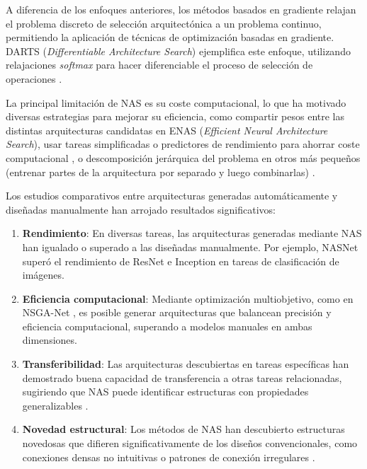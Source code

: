A diferencia de los enfoques anteriores, los métodos basados en gradiente relajan el problema discreto de selección arquitectónica a un problema continuo, permitiendo la aplicación de técnicas de optimización basadas en gradiente. DARTS (\textit{Differentiable Architecture Search}) ejemplifica este enfoque, utilizando relajaciones \textit{softmax} para hacer diferenciable el proceso de selección de operaciones \cite{Liu2018}.



La principal limitación de NAS es su coste computacional, lo que ha motivado diversas estrategias para mejorar su eficiencia, como compartir pesos entre las distintas arquitecturas candidatas \cite{Pham2018} en ENAS (\textit{Efficient Neural Architecture Search}), usar tareas simplificadas o predictores de rendimiento para ahorrar coste computacional \cite{Baker2018}, o descomposición jerárquica del problema en otros más pequeños (entrenar partes de la arquitectura por separado y luego combinarlas) \cite{Miikkulainen2019,Liu2018}.


Los estudios comparativos entre arquitecturas generadas automáticamente y diseñadas manualmente han arrojado resultados significativos:

\begin{enumerate}
\item \textbf{Rendimiento}: En diversas tareas, las arquitecturas generadas mediante NAS han igualado o superado a las diseñadas manualmente. Por ejemplo, NASNet \cite{Zoph2018} superó el rendimiento de ResNet e Inception en tareas de clasificación de imágenes.

\item \textbf{Eficiencia computacional}: Mediante optimización multiobjetivo, como en NSGA-Net \cite{Lu2018}, es posible generar arquitecturas que balancean precisión y eficiencia computacional, superando a modelos manuales en ambas dimensiones.

\item \textbf{Transferibilidad}: Las arquitecturas descubiertas en tareas específicas han demostrado buena capacidad de transferencia a otras tareas relacionadas, sugiriendo que NAS puede identificar estructuras con propiedades generalizables \cite{Lu2018}.

\item \textbf{Novedad estructural}: Los métodos de NAS han descubierto estructuras novedosas que difieren significativamente de los diseños convencionales, como conexiones densas no intuitivas o patrones de conexión irregulares \cite{Real2019}.
\end{enumerate}



